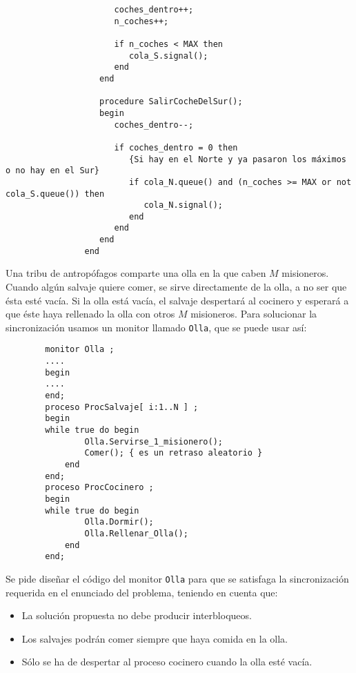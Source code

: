 \begin{ejercicio}
\begin{enumerate}
\begin{verbatim}
                      coches_dentro++;
                      n_coches++;

                      if n_coches < MAX then
                         cola_S.signal();
                      end
                   end

                   procedure SalirCocheDelSur();
                   begin
                      coches_dentro--;

                      if coches_dentro = 0 then
                         {Si hay en el Norte y ya pasaron los máximos o no hay en el Sur}
                         if cola_N.queue() and (n_coches >= MAX or not cola_S.queue()) then
                            cola_N.signal();
                         end
                      end
                   end
                end
            \end{verbatim}
    \end{enumerate}
\end{ejercicio}

\begin{ejercicio}
    Una tribu de antropófagos comparte una olla en la que caben $M$ misioneros. Cuando algún salvaje quiere comer, se sirve directamente de la olla, a no ser que ésta esté vacía. Si la olla está vacía, el salvaje despertará al cocinero y esperará a que éste haya rellenado la olla con otros $M$ misioneros. Para solucionar la sincronización usamos un monitor llamado \verb|Olla|, que se puede usar así:
    \begin{verbatim}
        monitor Olla ;
        ....
        begin
        ....
        end;
        proceso ProcSalvaje[ i:1..N ] ;
        begin
        while true do begin
                Olla.Servirse_1_misionero();
                Comer(); { es un retraso aleatorio }
            end
        end;
        proceso ProcCocinero ;
        begin
        while true do begin
                Olla.Dormir();
                Olla.Rellenar_Olla();
            end
        end;
    \end{verbatim}

    Se pide diseñar el código del monitor \verb|Olla| para que se satisfaga la sincronización requerida en el enunciado del problema, teniendo en cuenta que:
    \begin{itemize}
        \item La solución propuesta no debe producir interbloqueos.
        \item Los salvajes podrán comer siempre que haya comida en la olla.
        \item Sólo se ha de despertar al proceso cocinero cuando la olla esté vacía.
    \end{itemize}
\end{ejercicio}

